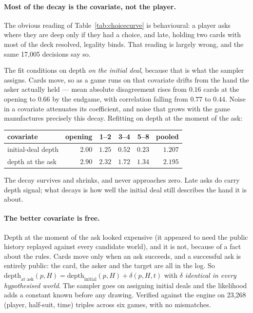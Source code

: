 \documentclass[11pt,letterpaper]{article}
\begin{document}
\paragraph{Most of the decay is the covariate, not the player.} The obvious
reading of Table~\ref{tab:choicecurve} is behavioural: a player asks where they
are deep only if they had a choice, and late, holding two cards with most of the
deck resolved, legality binds. That reading is largely wrong, and the same
17{,}005 decisions say so.

The fit conditions on depth \emph{on the initial deal}, because that is what the
sampler assigns. Cards move, so as a game runs on that covariate drifts from the
hand the asker actually held --- mean absolute disagreement rises from $0.16$
cards at the opening to $0.66$ by the endgame, with correlation falling from
$0.77$ to $0.44$. Noise in a covariate attenuates its coefficient, and noise that
grows with the game manufactures precisely this decay. Refitting on depth at the
moment of the ask:

\begin{center}
\small
\begin{tabular}{lrrrrr}
\toprule
covariate & opening & 1--2 & 3--4 & 5--8 & pooled \\
\midrule
initial-deal depth & $2.00$ & $1.25$ & $0.52$ & $0.23$ & $1.207$ \\
depth at the ask   & $2.90$ & $2.32$ & $1.72$ & $1.34$ & $2.195$ \\
\bottomrule
\end{tabular}
\end{center}

The decay survives and shrinks, and never approaches zero. Late asks do carry
depth signal; what decays is how well the initial deal still describes the hand
it is about.

\paragraph{The better covariate is free.} Depth at the moment of the ask looked
expensive (it appeared to need the public history replayed against every
candidate world), and it is not, because of a fact about the rules. Cards move
only when an ask succeeds, and a successful ask is entirely public: the card, the
asker and the target are all in the log. So
$\text{depth}_{\text{at ask}}(p,H) = \text{depth}_{\text{initial}}(p,H) +
\delta(p,H,t)$ with $\delta$ \emph{identical in every hypothesised world}. The
sampler goes on assigning initial deals and the likelihood adds a constant known
before any drawing. Verified against the engine on 23{,}268
(player, half-suit, time) triples across six games, with no mismatches.
\end{document}
